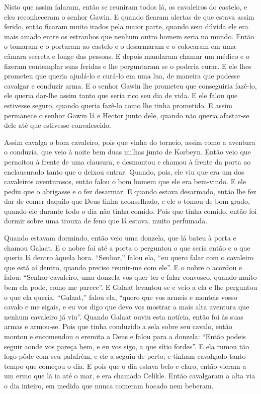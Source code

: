 Nisto que assim falaram, então se reuniram todos lá, os cavaleiros do castelo, e
eles reconheceram o senhor Gawin. E quando ficaram alertas de que estava assim
ferido, então ficaram muito irados pela maior parte, quando sem dúvida ele era
mais amado entre os estranhos que nenhum outro homem seria no mundo. Então o
tomaram e o portaram ao castelo e o desarmaram e o colocaram em uma câmara
secreta e longe das pessoas. E depois mandaram chamar um médico e o fizeram
contemplar suas feridas e lhe perguntaram se o poderia curar. E ele lhes
prometeu que queria ajudá-lo e curá-lo em uma lua, de maneira que pudesse
cavalgar e conduzir arma. E o senhor Gawin lhe prometeu que conseguiria
fazê-lo, ele queria dar-lhe assim tanto que seria rico seu dia de vida. E ele
falou que estivesse seguro, quando queria fazê-lo como lhe tinha prometido. E
assim permanece o senhor Gawin lá e Hector junto dele, quando não queria
afastar-se dele até que estivesse convalescido.

Assim cavalga o bom cavaleiro, pois que vinha do torneio, assim como a aventura
o conduzia, que veio à noite bem duas milhas junto de Korbeyn. Então veio que
pernoitou à frente de uma clausura, e desmontou e chamou à frente da porta ao
enclausurado tanto que o deixou entrar. Quando, pois, ele viu que era um dos
cavaleiros aventurosos, então falou o bom homem que ele era bem-vindo. E ele
pediu que o abrigasse e o fez desarmar. E quando estava desarmado, então lhe
fez dar de comer daquilo que Deus tinha aconselhado, e ele o tomou de bom
grado, quando ele durante todo o dia não tinha comido. Pois que tinha comido,
então foi dormir sobre uma trouxa de feno que lá estava, muito perfumada. 

Quando estavam dormindo, então veio uma donzela, que lá bateu à porta e chamou
Galaat. E o nobre foi até a porta o perguntou o que seria então e o que queria
lá dentro àquela hora. “Senhor,” falou ela, “eu quero falar com o cavaleiro que
está aí dentro, quando preciso reunir-me com ele”. E o nobre o acordou e falou:
“Senhor cavaleiro, uma donzela vos quer ter e falar convosco, quando muito bem
ela pode, como me parece”. E Galaat levantou-se e veio a ela e lhe perguntou o
que ela queria. “Galaat,” falou ela, “quero que vos armeis e monteis vosso
cavalo e me sigais, e eu vos digo que devo vos mostrar a mais alta aventura que
nenhum cavaleiro já viu”. Quando Galaat ouviu esta notícia, então foi às suas
armas e armou-se. Pois que tinha conduzido a sela sobre seu cavalo, então
montou e encomendou o eremita a Deus e falou para a donzela: “Então podeis
seguir aonde vos pareça bem, e eu vos sigo, a que sítio fordes”. E ela rumou tão
logo pôde com seu palafrém, e ele a seguiu de perto; e tinham cavalgado tanto
tempo que começou o dia. E pois que o dia estava belo e claro, então vieram a
um ermo que lá ia até o mar, e era chamado Celikle. Então cavalgaram a alta via
o dia inteiro, em medida que nunca comeram bocado nem beberam. 

